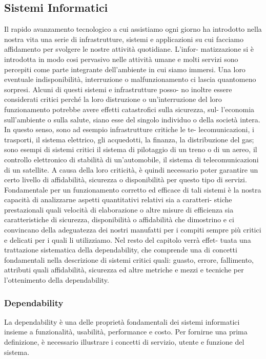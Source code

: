\documentclass[14pt]{extarticle}
\begin{document}
\subsection{Sistemi Informatici}
Il rapido avanzamento tecnologico a cui assistiamo ogni giorno ha introdotto nella nostra vita una serie di infrastrutture, sistemi e applicazioni su
cui facciamo affidamento per svolgere le nostre attività quotidiane. L’infor-
matizzazione si è introdotta in modo cosi pervasivo nelle attività umane e
molti servizi sono percepiti come parte integrante dell’ambiente in cui siamo
immersi. Una loro eventuale indisponibilità, interruzione o malfunzionamento
ci lascia quantomeno sorpresi. Alcuni di questi sistemi e infrastrutture posso-
no inoltre essere considerati critici perché la loro distruzione o un’interruzione
del loro funzionamento potrebbe avere effetti catastrofici sulla sicurezza, sul-
l’economia sull’ambiente o sulla salute, siano esse del singolo individuo o della
società intera. In questo senso, sono ad esempio infrastrutture critiche le te-
lecomunicazioni, i trasporti, il sistema elettrico, gli acquedotti, la finanza, la
distribuzione del gas; sono esempi di sistemi critici il sistema di pilotaggio di
un treno o di un aereo, il controllo elettronico di stabilità di un’automobile,
il sistema di telecomunicazioni di un satellite. A causa della loro criticità, è
quindi necessario poter garantire un certo livello di affidabilità, sicurezza o
disponibilità per questo tipo di servizi.
Fondamentale per un funzionamento corretto ed efficace di tali sistemi è
la nostra capacità di analizzarne aspetti quantitativi relativi sia a caratteri-
stiche prestazionali quali velocità di elaborazione o altre misure di efficienza
sia caratteristiche di sicurezza, disponibilità o affidabilità che dimostrino e ci
convincano della adeguatezza dei nostri manufatti per i compiti sempre più
critici e delicati per i quali li utilizziamo. Nel resto del capitolo verrà effet-
tuata una trattazione sistematica della dependability, che comprende una di
concetti fondamentali nella descrizione di sistemi critici quali: guasto, errore,
fallimento, attributi quali affidabilità, sicurezza ed altre metriche e mezzi e
tecniche per l’ottenimento della dependability.
\subsubsection{Dependability}
La dependability è una delle proprietà fondamentali dei sistemi informatici insieme a funzionalità, usabilità, performance e costo. Per fornirne una prima definizione, è necessario illustrare i concetti di servizio, utente e funzione del sistema.
\end{document}
